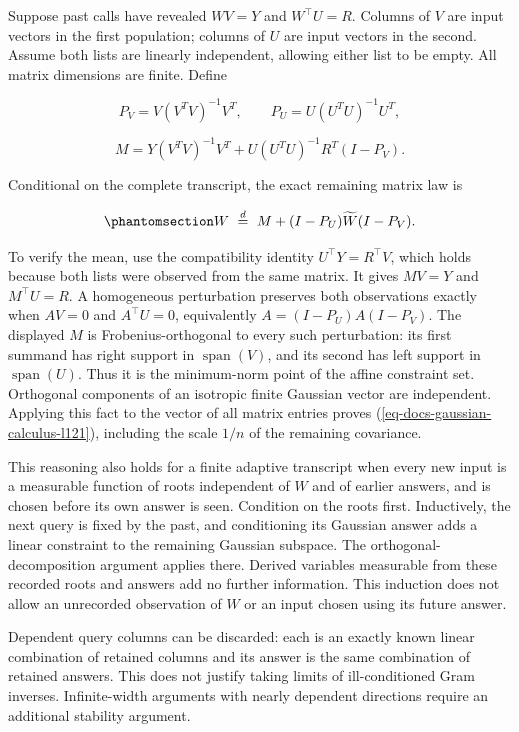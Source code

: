 \documentclass[
  11pt,
]{article}
\theoremstyle{definition}
\theoremstyle{plain}
\theoremstyle{plain}
\theoremstyle{plain}
\theoremstyle{remark}
\begin{document}
Suppose past calls have revealed \(WV=Y\) and \(W^{\top}U=R\). Columns
of \(V\) are input vectors in the first population; columns of \(U\) are
input vectors in the second. Assume both lists are linearly independent,
allowing either list to be empty. All matrix dimensions are finite.
Define

\[
P_V=V(V^TV)^{-1}V^T,\qquad P_U=U(U^TU)^{-1}U^T,
\]

\[
M=Y(V^TV)^{-1}V^T+U(U^TU)^{-1}R^T(I-P_V).
\]

Conditional on the complete transcript, the exact remaining matrix law
is

\begin{equation}\protect\phantomsection\label{eq-docs-gaussian-calculus-l121}{
W\ \overset d=\ M+(I-P_U)\widetilde W(I-P_V).
}\end{equation}

To verify the mean, use the compatibility identity
\(U^{\top}Y=R^{\top}V\), which holds because both lists were observed
from the same matrix. It gives \(MV=Y\) and \(M^{\top}U=R\). A
homogeneous perturbation preserves both observations exactly when
\(AV=0\) and \(A^{\top}U=0\), equivalently \(A=(I-P_U)A(I-P_V)\). The
displayed \(M\) is Frobenius-orthogonal to every such perturbation: its
first summand has right support in \(\operatorname{span}(V)\), and its
second has left support in \(\operatorname{span}(U)\). Thus it is the
minimum-norm point of the affine constraint set. Orthogonal components
of an isotropic finite Gaussian vector are independent. Applying this
fact to the vector of all matrix entries proves
(\ref{eq-docs-gaussian-calculus-l121}), including the scale \(1/n\) of
the remaining covariance.

This reasoning also holds for a finite adaptive transcript when every
new input is a measurable function of roots independent of \(W\) and of
earlier answers, and is chosen before its own answer is seen. Condition
on the roots first. Inductively, the next query is fixed by the past,
and conditioning its Gaussian answer adds a linear constraint to the
remaining Gaussian subspace. The orthogonal-decomposition argument
applies there. Derived variables measurable from these recorded roots
and answers add no further information. This induction does not allow an
unrecorded observation of \(W\) or an input chosen using its future
answer.

Dependent query columns can be discarded: each is an exactly known
linear combination of retained columns and its answer is the same
combination of retained answers. This does not justify taking limits of
ill-conditioned Gram inverses. Infinite-width arguments with nearly
dependent directions require an additional stability argument.
\end{document}
